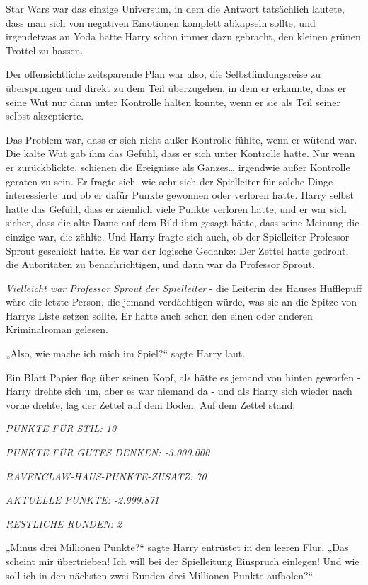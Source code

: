 {Star Wars war das einzige Universum, in dem die Antwort tatsächlich lautete, dass man sich von negativen Emotionen komplett abkapseln sollte, und irgendetwas an Yoda hatte Harry schon immer dazu gebracht, den kleinen grünen Trottel zu hassen.

Der offensichtliche zeitsparende Plan war also, die Selbstfindungsreise zu überspringen und direkt zu dem Teil überzugehen, in dem er erkannte, dass er seine Wut nur dann unter Kontrolle halten konnte, wenn er sie als Teil seiner selbst akzeptierte.

Das Problem war, dass er sich nicht außer Kontrolle fühlte, wenn er wütend war. Die kalte Wut gab ihm das Gefühl, dass er sich unter Kontrolle hatte. Nur wenn er zurückblickte, schienen die Ereignisse als Ganzes… irgendwie außer Kontrolle geraten zu sein. Er fragte sich, wie sehr sich der Spielleiter für solche Dinge interessierte und ob er dafür Punkte gewonnen oder verloren hatte. Harry selbst hatte das Gefühl, dass er ziemlich viele Punkte verloren hatte, und er war sich sicher, dass die alte Dame auf dem Bild ihm gesagt hätte, dass seine Meinung die einzige war, die zählte. Und Harry fragte sich auch, ob der Spielleiter Professor Sprout geschickt hatte. Es war der logische Gedanke: Der Zettel hatte gedroht, die Autoritäten zu benachrichtigen, und dann war da Professor Sprout.

\emph{Vielleicht war Professor Sprout der Spielleiter} - die Leiterin des Hauses Hufflepuff wäre die letzte Person, die jemand verdächtigen würde, was sie an die Spitze von Harrys Liste setzen sollte. Er hatte auch schon den einen oder anderen Kriminalroman gelesen.

„Also, wie mache ich mich im Spiel?“ sagte Harry laut.

Ein Blatt Papier flog über seinen Kopf, als hätte es jemand von hinten geworfen - Harry drehte sich um, aber es war niemand da - und als Harry sich wieder nach vorne drehte, lag der Zettel auf dem Boden. Auf dem Zettel stand:

\emph{PUNKTE FÜR STIL: 10}

\emph{PUNKTE FÜR GUTES DENKEN: -3.000.000}

\emph{RAVENCLAW-HAUS-PUNKTE-ZUSATZ: 70}

\emph{AKTUELLE PUNKTE: -2.999.871}

\emph{RESTLICHE RUNDEN: 2}

„Minus drei Millionen Punkte?“ sagte Harry entrüstet in den leeren Flur. „Das scheint mir übertrieben! Ich will bei der Spielleitung Einspruch einlegen! Und wie soll ich in den nächsten zwei Runden drei Millionen Punkte aufholen?“

}
